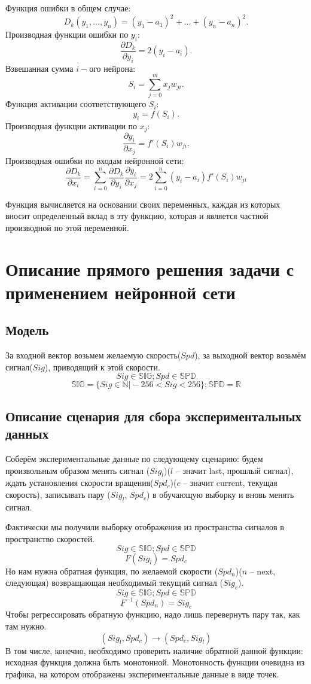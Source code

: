 \documentclass[14pt]{extreport}
\begin{document}
        Функция ошибки в общем случае:
            $$D_k(y_1,...,y_n)=(y_1-a_1)^2+...+(y_n-a_n)^2.$$
        Производная функции ошибки по $y_i$:
            $$\frac{\partial{D_k}}{\partial{y_i}}=2(y_i-a_i).$$
        Взвешанная сумма $i-$ого нейрона:
            $$S_i=\sum_{j=0}^{m}x_j w_{ji}.$$
        Функция активации соответствующего $S_i$:
            $$y_i=f(S_i).$$
        Производная функции активации по $x_j$:
            $$\frac{\partial{y_i}}{\partial{x_j}}={f'(S_i)w_{ji}}.$$
        Производная ошибки по входам нейронной сети:
            $$\frac{\partial{D_k}}{\partial {x_i}}=\sum_{i=0}^{n}\frac{\partial{D_k}}{\partial {y_i}}\frac{\partial{y_i}}{\partial {x_j}} = 2\sum_{i=0}^{n}(y_i-a_i)f'(S_i)w_{ji}$$

    Функция вычисляется на основании своих переменных, каждая из которых вносит определенный вклад в эту функцию, которая и является частной производной по этой переменной.
\newpage
    \chapter{Описание прямого решения задачи с применением нейронной сети}
            \section{Модель}
                За входной вектор возьмем желаемую скорость($Spd$), за выходной вектор возьмём сигнал($Sig$), приводящий к этой скорости.
                \[Sig \in \mathbb{SIG}; Spd \in \mathbb{SPD}\]
                \[\mathbb{SIG} = \{Sig \in \mathbb{N}\vert -256 < Sig < 256\}; \mathbb{SPD} = \mathbb{R}\]
            \section{Описание сценария для сбора экспериментальных данных}
                Соберём экспериментальные данные по следующему сценарию: будем произвольным образом менять сигнал ($Sig_l$)($l$ -- значит last, прошлый сигнал), ждать установления скорости вращения($Spd_c$)($c$ -- значит current, текущая скорость), записывать пару ($Sig_l$, $Spd_c$) в обучающую выборку и вновь менять сигнал.

                Фактически мы получили выборку отображения из пространства сигналов в пространство скоростей.
                \[Sig \in \mathbb{SIG}; Spd \in \mathbb{SPD}\]
                \[F(Sig_l) = Spd_c\]
                Но нам нужна обратная функция, по желаемой скорости ($Spd_n$)($n$ -- next, следующая) возвращающая необходимый текущий сигнал ($Sig_c$).
                \[Sig \in \mathbb{SIG}; Spd \in \mathbb{SPD}\]
                \[F^{-1}(Spd_n) = Sig_c\]
                Чтобы регрессировать обратную функцию, надо лишь перевернуть пару так, как там нужно.
                \[(Sig_l, Spd_c) \rightarrow (Spd_c, Sig_l)\]
                В том числе, конечно, необходимо проверить наличие обратной данной функции: исходная функция должна быть монотонной. Монотонность функции очевидна из графика, на котором отображены экспериментальные данные в виде точек.
\end{document}
